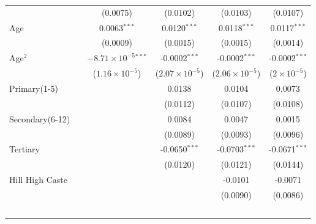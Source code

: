\begin{tabular}{lccccc}
                                                     &                & (0.0075)                       & (0.0102)                & (0.0103)                & (0.0107)\\   
   Age                                               &                & 0.0063$^{***}$                 & 0.0120$^{***}$          & 0.0118$^{***}$          & 0.0117$^{***}$\\   
                                                     &                & (0.0009)                       & (0.0015)                & (0.0015)                & (0.0014)\\   
   Age$^2$                                      &                & $-8.71\times 10^{-5}$$^{***}$  & -0.0002$^{***}$         & -0.0002$^{***}$         & -0.0002$^{***}$\\   
                                                     &                & ($1.16\times 10^{-5}$)         & ($2.07\times 10^{-5}$)  & ($2.06\times 10^{-5}$)  & ($2\times 10^{-5}$)\\    
   Primary(1-5)           &                &                                & 0.0138                  & 0.0104                  & 0.0073\\   
                                                     &                &                                & (0.0112)                & (0.0107)                & (0.0108)\\   
   Secondary(6-12)        &                &                                & 0.0084                  & 0.0047                  & 0.0015\\   
                                                     &                &                                & (0.0089)                & (0.0093)                & (0.0096)\\   
   Tertiary               &                &                                & -0.0650$^{***}$         & -0.0703$^{***}$         & -0.0671$^{***}$\\   
                                                     &                &                                & (0.0120)                & (0.0121)                & (0.0144)\\   
   Hill High Caste                    &                &                                &                         & -0.0101                 & -0.0071\\   
                                                     &                &                                &                         & (0.0090)                & (0.0086)\\   
$$
\end{tabular}
